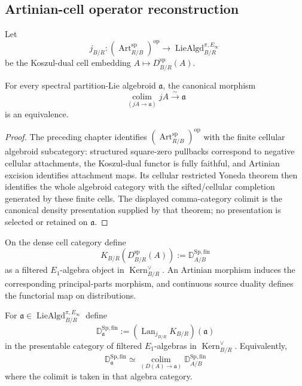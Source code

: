 \subsection{Artinian-cell operator reconstruction}

Let
\[
    j_{B/R}:
    (\operatorname{Art}_{R/B}^{\mathrm{sp}})^{\mathrm{op}}
    \longrightarrow
    \operatorname{LieAlgd}_{B/R}^{\pi,E_\infty}
\]
be the Koszul-dual cell embedding
$A\mapsto D_{B/R}^{\mathrm{sp}}(A)$.

\begin{theorem}
\label{thm:as-artinian-cell-density}
For every spectral partition-Lie algebroid $\mathfrak a$, the canonical
morphism
\[
\boxed{
    \operatorname*{colim}_{(jA\to\mathfrak a)}jA
    \xrightarrow{\sim}
    \mathfrak a
}
\]
is an equivalence.
\end{theorem}

\begin{proof}
The preceding chapter identifies
$(\operatorname{Art}_{R/B}^{\mathrm{sp}})^{\mathrm{op}}$ with the finite
cellular algebroid subcategory: structured square-zero pullbacks correspond
to negative cellular attachments, the Koszul-dual functor is fully faithful,
and Artinian excision identifies attachment maps.  Its cellular restricted
Yoneda theorem then identifies the whole algebroid category with the
sifted/cellular completion generated by these finite cells.  The displayed
comma-category colimit is the canonical density presentation supplied by
that theorem; no presentation is selected or retained on $\mathfrak a$.
\end{proof}

\begin{definition}
\label{def:as-cell-operator-functor}
On the dense cell category define
\[
\boxed{
    K_{B/R}
    \left(
        D_{B/R}^{\mathrm{sp}}(A)
    \right)
    :=
    \mathbb D_{A/B}^{\mathrm{Sp,fin}}
}
\]
as a filtered $E_1$-algebra object in
$\operatorname{Kern}^{\vee}_{B/R}$.  An Artinian morphism induces the
corresponding principal-parts morphism, and continuous source duality defines
the functorial map on distributions.
\end{definition}

\begin{definition}
\label{def:as-cellular-spencer-operator-algebra}
For
$\mathfrak a\in\operatorname{LieAlgd}_{B/R}^{\pi,E_\infty}$ define
\[
\boxed{
    \mathbb D_{\mathfrak a}^{\mathrm{Sp,fin}}
    :=
    (\operatorname{Lan}_{j_{B/R}}K_{B/R})(\mathfrak a)
}
\]
in the presentable category of filtered $E_1$-algebras in
$\operatorname{Kern}^{\vee}_{B/R}$.
Equivalently,
\[
    \mathbb D_{\mathfrak a}^{\mathrm{Sp,fin}}
    \simeq
    \operatorname*{colim}_{(D(A)\to\mathfrak a)}
    \mathbb D_{A/B}^{\mathrm{Sp,fin}}
\]
where the colimit is taken in that algebra category.
\end{definition}


